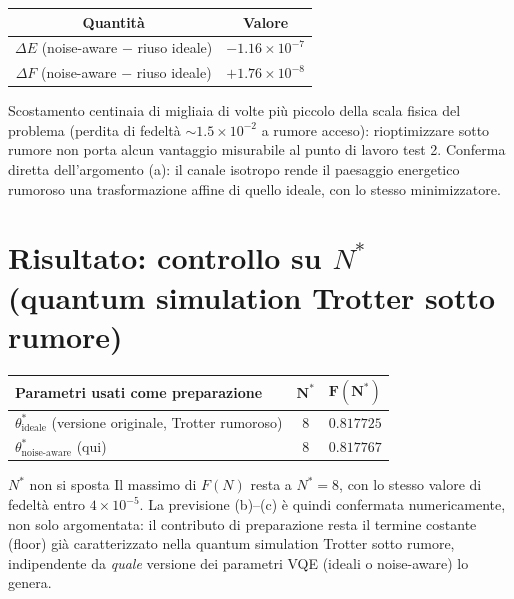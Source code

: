 \documentclass[11pt,a4paper]{article}
\begin{document}
\begin{center}
\renewcommand{\arraystretch}{1.2}
\begin{tabular}{@{}cc@{}}
\toprule
\textbf{Quantità} & \textbf{Valore}\\
\midrule
$\Delta E$ (noise-aware $-$ riuso ideale) & $-1.16\times10^{-7}$\\
$\Delta F$ (noise-aware $-$ riuso ideale) & $+1.76\times10^{-8}$\\
\bottomrule
\end{tabular}
\end{center}

\noindent Scostamento centinaia di migliaia di volte più piccolo della
scala fisica del problema (perdita di fedeltà $\sim1.5\times10^{-2}$ a
rumore acceso): rioptimizzare sotto rumore non porta alcun vantaggio
misurabile al punto di lavoro test 2. Conferma diretta dell'argomento (a):
il canale isotropo rende il paesaggio energetico rumoroso una
trasformazione affine di quello ideale, con lo stesso minimizzatore.

\section*{Risultato: controllo su $N^*$ (quantum simulation Trotter sotto rumore)}

\begin{center}
\renewcommand{\arraystretch}{1.2}
\begin{tabular}{@{}lcc@{}}
\toprule
\textbf{Parametri usati come preparazione} & $\boldsymbol{N^*}$ & $\boldsymbol{F(N^*)}$\\
\midrule
$\theta^*_\text{ideale}$ (versione originale, Trotter rumoroso) & $8$ & $0.817725$\\
$\theta^*_\text{noise-aware}$ (qui) & $8$ & $0.817767$\\
\bottomrule
\end{tabular}
\end{center}

\begin{okbox}{$N^*$ non si sposta}
Il massimo di $F(N)$ resta a $N^*=8$, con lo stesso valore di fedeltà
entro $4\times10^{-5}$. La previsione (b)--(c) è quindi confermata
numericamente, non solo argomentata: il contributo di preparazione resta
il termine costante (floor) già caratterizzato nella quantum simulation
Trotter sotto rumore, indipendente
da \emph{quale} versione dei parametri VQE (ideali o noise-aware) lo
genera.
\end{okbox}
\end{document}

